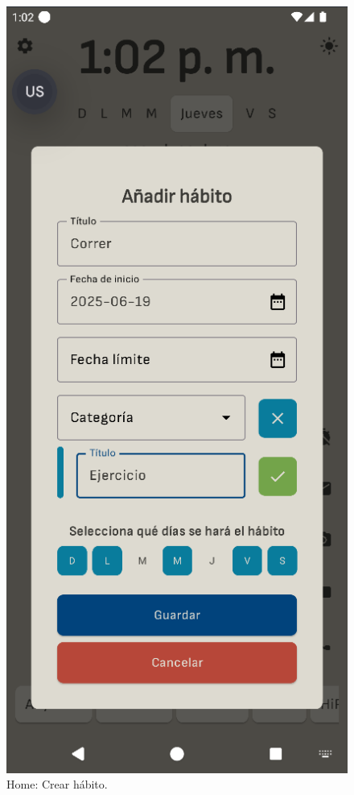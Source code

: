 \begin{figure}[ht]
  \centering
  \captionsetup{justification=centering}
  \begin{minipage}{0.43\textwidth}
    \caption{Home: Crear hábito.}
    \label{fig:home:crear_habito}
    \centering
    \includegraphics[width=\textwidth]{Figuras/secciones/crear_habito.png}

\end{minipage}
\end{figure}
